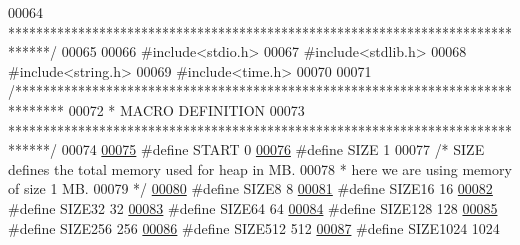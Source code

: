 \begin{DoxyCode}
{00064 \textcolor{comment}{ ******************************************************************************/}
00065 
00066 \textcolor{preprocessor}{#include<stdio.h>}
00067 \textcolor{preprocessor}{#include<stdlib.h>}
00068 \textcolor{preprocessor}{#include<string.h>}
00069 \textcolor{preprocessor}{#include<time.h>}
00070 
00071 \textcolor{comment}{/*******************************************************************************}
00072 \textcolor{comment}{ * MACRO DEFINITION}
00073 \textcolor{comment}{ ******************************************************************************/}
00074 
\hypertarget{memory_management_8h_source_l00075}{}\hyperlink{memory_management_8h_a3018c7600b7bb9866400596a56a57af7}{00075} \textcolor{preprocessor}{#define START                             0}
\hypertarget{memory_management_8h_source_l00076}{}\hyperlink{memory_management_8h_a70ed59adcb4159ac551058053e649640}{00076} \textcolor{preprocessor}{#define SIZE                              1  }
00077 \textcolor{comment}{/* SIZE defines the total memory used for heap in MB.}
00078 \textcolor{comment}{ * here we are using memory of size 1 MB.}
00079 \textcolor{comment}{ */}
\hypertarget{memory_management_8h_source_l00080}{}\hyperlink{memory_management_8h_aee573b883518260a48d5e5859eb67700}{00080} \textcolor{preprocessor}{#define SIZE8                             8}
\hypertarget{memory_management_8h_source_l00081}{}\hyperlink{memory_management_8h_a0feb4c9d3655c1f4cc571c001ffbf98d}{00081} \textcolor{preprocessor}{#define SIZE16                            16}
\hypertarget{memory_management_8h_source_l00082}{}\hyperlink{memory_management_8h_ae8fb92f2869c13efccdf7932b67311d2}{00082} \textcolor{preprocessor}{#define SIZE32                            32}
\hypertarget{memory_management_8h_source_l00083}{}\hyperlink{memory_management_8h_ae9c1e737f774b22d3ef5dc32e7c74639}{00083} \textcolor{preprocessor}{#define SIZE64                            64}
\hypertarget{memory_management_8h_source_l00084}{}\hyperlink{memory_management_8h_ac769905d29a0721a496c954d5a521a88}{00084} \textcolor{preprocessor}{#define SIZE128                           128}
\hypertarget{memory_management_8h_source_l00085}{}\hyperlink{memory_management_8h_ad7a598f0d1b7049e2ef4f137b30d90df}{00085} \textcolor{preprocessor}{#define SIZE256                           256}
\hypertarget{memory_management_8h_source_l00086}{}\hyperlink{memory_management_8h_a11a83fb1f003909dc61b3347346d2f0f}{00086} \textcolor{preprocessor}{#define SIZE512                           512}
\hypertarget{memory_management_8h_source_l00087}{}\hyperlink{memory_management_8h_afc256d6d9b1c3d78c147ab6ccacc7e8a}{00087} \textcolor{preprocessor}{#define SIZE1024                          1024}
}
\end{DoxyCode}
